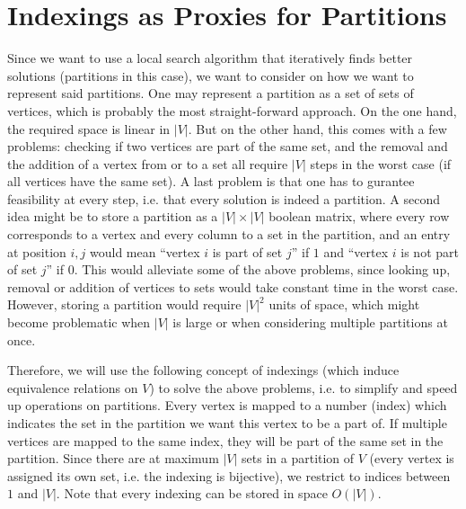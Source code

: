 \section{Indexings as Proxies for Partitions}\label{sec:indexings}
Since we want to use a local search algorithm that iteratively finds better solutions (partitions in this case), we want to consider on how we want to represent said partitions. One may represent a partition as a set of sets of vertices, which is probably the most straight-forward approach. On the one hand, the required space is linear in $|V|$. But on the other hand, this comes with a few problems: checking if two vertices are part of the same set, and the removal and the addition of a vertex from or to a set all require $|V|$ steps in the worst case (if all vertices have the same set). A last problem is that one has to gurantee feasibility at every step, i.e. that every solution is indeed a partition. A second idea might be to store a partition as a $|V| \times |V|$ boolean matrix, where every row corresponds to a vertex and every column to a set in the partition, and an entry at position $i,j$ would mean ``vertex $i$ is part of set $j$'' if $1$ and ``vertex $i$ is not part of set $j$'' if $0$. This would alleviate some of the above problems, since looking up, removal or addition of vertices to sets would take constant time in the worst case. However, storing a partition would require $|V|^2$ units of space, which might become problematic when $|V|$ is large or when considering multiple partitions at once.

Therefore, we will use the following concept of indexings (which induce equivalence relations on $V$) to solve the above problems, i.e. to simplify and speed up operations on partitions. Every vertex is mapped to a number (index) which indicates the set in the partition we want this vertex to be a part of. If multiple vertices are mapped to the same index, they will be part of the same set in the partition. Since there are at maximum $|V|$ sets in a partition of $V$ (every vertex is assigned its own set, i.e. the indexing is bijective), we restrict to indices between $1$ and $|V|$. Note that every indexing can be stored in space $O(|V|)$.


